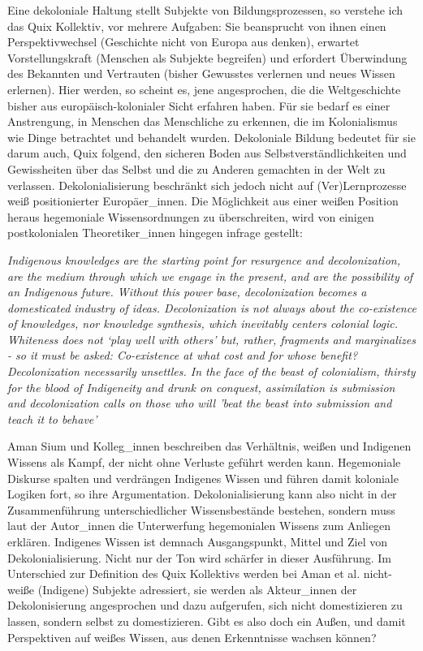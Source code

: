 \documentclass[11pt]{article}
\newenvironment{myenv}{\begin{adjustwidth}{2cm}{}}{\end{adjustwidth}}
\begin{document}
Eine dekoloniale Haltung stellt Subjekte von Bildungsprozessen, so verstehe ich
das Quix Kollektiv, vor mehrere Aufgaben: Sie beansprucht von ihnen einen
Perspektivwechsel (Geschichte nicht von Europa aus denken), erwartet
Vorstellungskraft (Menschen als Subjekte begreifen) und erfordert Überwindung
des Bekannten und Vertrauten (bisher Gewusstes verlernen und neues Wissen
erlernen).  Hier werden, so scheint es, jene angesprochen, die die
Weltgeschichte bisher aus europäisch-kolonialer Sicht erfahren haben. Für sie
bedarf es einer Anstrengung, in Menschen das Menschliche zu erkennen, die im
Kolonialismus wie Dinge betrachtet und behandelt wurden. Dekoloniale Bildung
bedeutet für sie darum auch, Quix folgend, den sicheren Boden aus
Selbstverständlichkeiten und Gewissheiten über das Selbst und die zu Anderen
gemachten in der Welt zu verlassen. Dekolonialisierung beschränkt sich jedoch
nicht auf (Ver)Lernprozesse weiß positionierter Europäer\_innen. Die Möglichkeit
aus einer weißen Position heraus hegemoniale Wissensordnungen zu überschreiten,
wird von einigen postkolonialen Theoretiker\_innen hingegen infrage gestellt:


  \begin{myenv}
  \textit{ \glqq Indigenous knowledges are the starting point for resurgence and
  decolonization, are the medium through which we engage in the present, and are
  the possibility of an Indigenous future. Without this power base,
  decolonization becomes a domesticated industry of ideas. Decolonization is not
  always about the co-existence of knowledges, nor knowledge synthesis, which
  inevitably centers colonial logic. Whiteness does not ‘play well with others’
  but, rather, fragments and marginalizes - so it must be asked: Co-existence at
  what cost and for whose benefit? Decolonization necessarily unsettles. In the
  face of the beast of colonialism, thirsty for the blood of Indigeneity and
  drunk on conquest, assimilation is submission and decolonization calls on
  those who will 'beat the beast into submission and teach it to behave' \grqq
  \footnotemark {}} 
  \end{myenv}

Aman Sium und Kolleg\_innen beschreiben das Verhältnis, weißen und Indigenen
Wissens als Kampf, der nicht ohne Verluste geführt werden kann. Hegemoniale
Diskurse spalten und verdrängen Indigenes Wissen und führen damit koloniale
Logiken fort, so ihre Argumentation. Dekolonialisierung kann also nicht in der
Zusammenführung unterschiedlicher Wissensbestände bestehen, sondern muss laut
der Autor\_innen die Unterwerfung hegemonialen Wissens zum Anliegen erklären.
Indigenes Wissen ist demnach Ausgangspunkt, Mittel und Ziel von
Dekolonialisierung. Nicht nur der Ton wird schärfer in dieser Ausführung.  Im
Unterschied zur Definition des Quix Kollektivs werden bei Aman et al.
nicht-weiße (Indigene) Subjekte adressiert, sie werden als Akteur\_innen der
Dekolonisierung angesprochen und dazu aufgerufen, sich nicht domestizieren zu
lassen, sondern selbst zu domestizieren. Gibt es also doch ein Außen, und damit
Perspektiven auf weißes Wissen, aus denen Erkenntnisse wachsen können?
\end{document}
